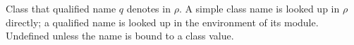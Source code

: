 Class that qualified name $q$ denotes in $\rho$. A simple class name is looked up in $\rho$
directly; a qualified name is looked up in the environment of its module. Undefined unless the name is
bound to a class value.
